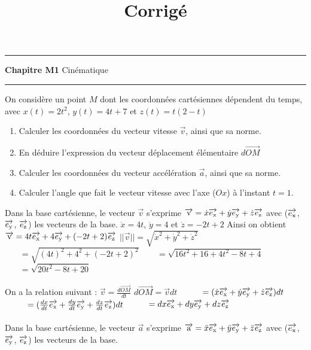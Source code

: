 \documentclass[11pt]{article}
\title{\bf{\pagetitle}\n\large{Corrigé}}
\def\pagetitle{Cinématique}
\begin{document}



\thispagestyle{fancy}
\fancyhead[C]{\pagetitle}

\hrule
\begin{center}
    \LARGE{\textbf{Chapitre M1}}\n
    \large{\pagetitle}\n
    \rule{0.8\textwidth}{0.5pt}
\end{center}


\vspace{0.5cm}

\begin{application}{}{}
    On considère un point $M$ dont les coordonnées cartésiennes dépendent du temps, avec \n
    $x(t) = 2t^{2}$, $y(t) = 4t + 7$ et $z(t) = t(2-t)$
    \begin{enumerate}
        \item Calculer les coordonnées du vecteur vitesse $\Vec{v}$, ainsi que sa norme.
        \item En déduire l’expression du vecteur déplacement élémentaire $d \Vec{OM}$
        \item Calculer les coordonnées du vecteur accélération $\Vec{a}$, ainsi que sa norme.
        \item Calculer l’angle que fait le vecteur vitesse avec l’axe ($Ox$) à l’instant $t = 1$.
    \end{enumerate}
    \tcblower\n
     Dans la base cartésienne, le vecteur $\Vec{v}$ s'exprime $\overrightarrow{\text{v}} = \Dot{x} \overrightarrow{e_{\text{x}}} + \Dot{y} \overrightarrow{e_{\text{y}}} + \Dot{z} \overrightarrow{e_{\text{z}}}$ avec ($\overrightarrow{e_{\text{x}}}$, $\overrightarrow{e_{\text{y}}}$, $\overrightarrow{e_{\text{z}}}$) les vecteurs de la base.\n
    $\Dot{x} = 4t$, $\Dot{y} = 4$ et $\Dot{z} = -2t + 2$\n
    Ainsi on obtient $\overrightarrow{\text{v}} = 4t \overrightarrow{e_{\text{x}}} + 4 \overrightarrow{e_{\text{y}}} + (-2t + 2) \overrightarrow{e_{\text{z}}}$\n
    $||\Vec{v}|| = \sqrt{\Dot{x}^{2} + \Dot{y}^{2} + \Dot{z}^{2}}$\n
    $~~~~~~~~ = \sqrt{(4t)^{2} + 4^{2} + (-2t + 2)^{2}}$\n
    $~~~~~~~~ = \sqrt{16t^{2} + 16 + 4t^{2} - 8t + 4}$\n
    $~~~~~~~~ = \sqrt{20t^{2} - 8t + 20}$\\\\
     On a la relation suivant : $\Vec{v} = \frac{d \Vec{OM}}{dt}$\n
    $d \Vec{OM} = \Vec{v} dt$\n
    $~~~~~~~~ = (\Dot{x} \overrightarrow{e_{\text{x}}} + \Dot{y} \overrightarrow{e_{\text{y}}} + \Dot{z} \overrightarrow{e_{\text{z}}}) dt$\n
    $~~~~~~~~ = (\frac{dx}{dt} \overrightarrow{e_{\text{x}}} + \frac{dy}{dt} \overrightarrow{e_{\text{y}}} + \frac{dz}{dt} \overrightarrow{e_{\text{z}}}) dt$\n
    $~~~~~~~~ = dx \overrightarrow{e_{\text{x}}} + dy \overrightarrow{e_{\text{y}}} + dz \overrightarrow{e_{\text{z}}}$\\\\
     Dans la base cartésienne, le vecteur $\Vec{a}$ s'exprime $\overrightarrow{\text{a}} = \Ddot{x} \overrightarrow{e_{\text{x}}} + \Ddot{y} \overrightarrow{e_{\text{y}}} + \Ddot{z} \overrightarrow{e_{\text{z}}}$ avec ($\overrightarrow{e_{\text{x}}}$, $\overrightarrow{e_{\text{y}}}$, $\overrightarrow{e_{\text{z}}}$) les vecteurs de la base.\n

\end{application}
\end{document}
